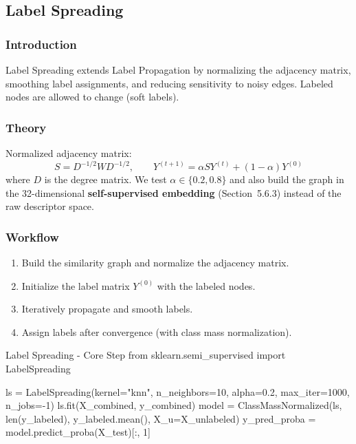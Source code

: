 \subsection{Label Spreading}

\subsubsection{Introduction}
Label Spreading extends Label Propagation by normalizing the adjacency matrix, smoothing label
assignments, and reducing sensitivity to noisy edges. Labeled nodes are allowed to change
(soft labels).

\subsubsection{Theory}
Normalized adjacency matrix:
\[
S = D^{-1/2} W D^{-1/2}, \qquad Y^{(t+1)} = \alpha S Y^{(t)} + (1-\alpha) Y^{(0)}
\]
where $D$ is the degree matrix. We test $\alpha \in \{0.2, 0.8\}$ and also build the graph in
the 32-dimensional \textbf{self-supervised embedding} (Section~5.6.3) instead of the raw
descriptor space.

\subsubsection{Workflow}
\begin{enumerate}
  \item Build the similarity graph and normalize the adjacency matrix.
  \item Initialize the label matrix $Y^{(0)}$ with the labeled nodes.
  \item Iteratively propagate and smooth labels.
  \item Assign labels after convergence (with class mass normalization).
\end{enumerate}

\begin{pycode}{Label Spreading - Core Step}
from sklearn.semi_supervised import LabelSpreading

ls = LabelSpreading(kernel="knn", n_neighbors=10, alpha=0.2, max_iter=1000, n_jobs=-1)
ls.fit(X_combined, y_combined)
model = ClassMassNormalized(ls, len(y_labeled), y_labeled.mean(), X_u=X_unlabeled)
y_pred_proba = model.predict_proba(X_test)[:, 1]
\end{pycode}

